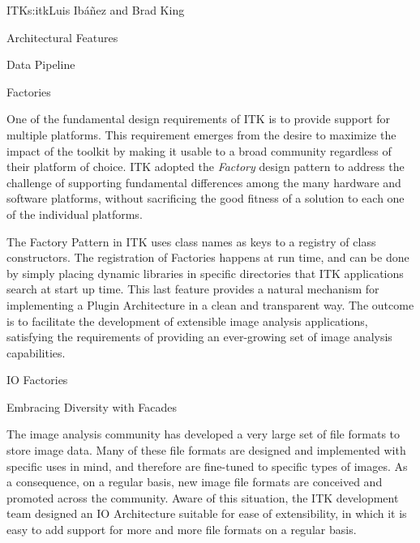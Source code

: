 \begin{aosachapter}{ITK}{s:itk}{Luis Ib\'{a}\~{n}ez and Brad King}
\begin{aosasect1}{Architectural Features}
\begin{aosasect2}{Data Pipeline}
\end{aosasect2}

\begin{aosasect2}{Factories}

One of the fundamental design requirements of ITK is to provide support for
multiple platforms. This requirement emerges from the desire to maximize the
impact of the toolkit by making it usable to a broad community regardless of
their platform of choice. ITK adopted the \emph{Factory} design pattern to
address the challenge of supporting fundamental differences among the many
hardware and software platforms, without sacrificing the good fitness of a
solution to each one of the individual platforms.

The Factory Pattern in ITK uses class names as keys to a registry of class
constructors. The registration of Factories happens at run time, and can be
done by simply placing dynamic libraries in specific directories that ITK
applications search at start up time. This last feature provides a natural
mechanism for implementing a Plugin Architecture in a clean and transparent
way. The outcome is to facilitate the development of extensible image analysis
applications, satisfying the requirements of providing an ever-growing set of
image analysis capabilities.

\end{aosasect2}

\begin{aosasect2}{IO Factories}

\begin{aosasect3}{Embracing Diversity with Facades}

The image analysis community has developed a very large set of file formats to
store image data. Many of these file formats are designed and implemented with
specific uses in mind, and therefore are fine-tuned to specific types of
images. As a consequence, on a regular basis, new image file formats are
conceived and promoted across the community. Aware of this situation, the ITK
development team designed an IO Architecture suitable for ease of
extensibility, in which it is easy to add support for more and more file
formats on a regular basis.



\end{aosasect3}
\end{aosasect2}
\end{aosasect1}
\end{aosachapter}

